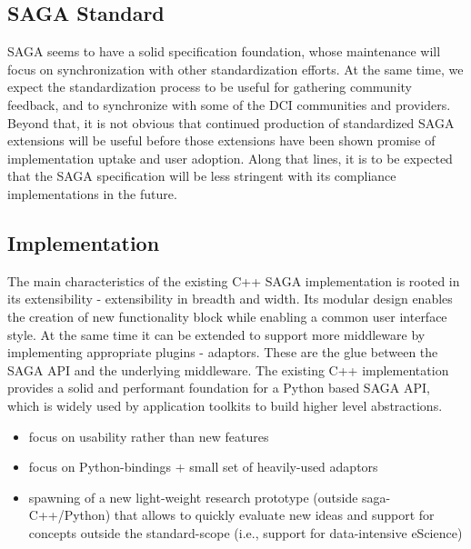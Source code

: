 \documentclass{article}
\newcommand{\I}[1]{\textit{#1}}
\newcommand{\B}[1]{\textbf{#1}}
\newcommand{\todo}[1]{{\textcolor{red}{\B{TODO:} #1 }}}
\begin{document}
  


 \subsection{SAGA Standard}

  SAGA seems to have a solid specification foundation, whose
  maintenance will focus on synchronization with other
  standardization efforts.  At the same time, we expect the
  standardization process to be useful for gathering community
  feedback, and to synchronize with some of the DCI communities and
  providers.  Beyond that, it is not obvious that continued production
  of standardized SAGA extensions will be useful before those
  extensions have been shown promise of implementation uptake and user
  adoption.  Along that lines, it is to be expected that the SAGA
  specification will be less stringent with its compliance
  implementations in the future.


 \subsection{Implementation}

  The main characteristics of the existing C++ SAGA implementation is
  rooted in its extensibility - extensibility in breadth and width.
  Its modular design enables the creation of new functionality block
  while enabling a common user interface style.  At the same time it
  can be extended to support more middleware by implementing
  appropriate plugins - adaptors. These are the glue between the SAGA
  API and the underlying middleware. The existing C++ implementation
  provides a solid and performant foundation for a Python based SAGA
  API, which is widely used by application toolkits to build higher
  level abstractions.

  \begin{itemize}
   \item focus on usability rather than new features
   \item focus on Python-bindings + small set of heavily-used adaptors
   \item spawning of a new light-weight research prototype (outside 
         saga-C++/Python) that allows to quickly evaluate new ideas 
         and support for concepts outside the standard-scope (i.e., 
         support for data-intensive eScience)
  \end{itemize}
\end{document}
